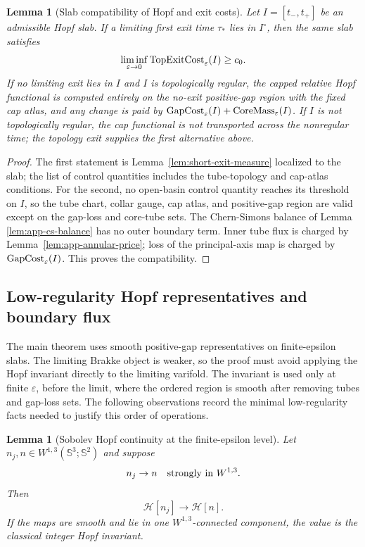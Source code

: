 \documentclass[11pt]{article}
\newtheorem{lemma}[theorem]{Lemma}
\theoremstyle{definition}
\newcommand{\Sph}{\mathbb S}
\newcommand{\eps}{\varepsilon}
\newcommand{\Hopf}{\mathcal H}
\begin{document}
\begin{lemma}[Slab compatibility of Hopf and exit costs]
\label{lem:app-slab-compatibility}
Let \(I=[t_-,t_+]\) be an admissible Hopf slab.  If a limiting first exit time
\(\tau_\ast\) lies in \(I^\circ\), then the same slab satisfies
\[
        \liminf_{\eps\to0}
        {\rm TopExitCost}_\eps(I)\ge c_0 .
\]
If no limiting exit lies in \(I\) and \(I\) is topologically regular, the capped
relative Hopf functional is computed entirely on the no-exit positive-gap
region with the fixed cap atlas, and any change is paid by
\({\rm GapCost}_\eps(I)+{\rm CoreMass}_\eps(I)\).  If \(I\) is not
topologically regular, the cap functional is not transported across the
nonregular time; the topology exit supplies the first alternative above.
\end{lemma}

\begin{proof}
The first statement is Lemma~\ref{lem:short-exit-measure} localized to the
slab; the list of control quantities includes the tube-topology and cap-atlas conditions. For
the second, no open-basin control quantity reaches its threshold on \(I\), so the tube
chart, collar gauge, cap atlas, and positive-gap region are valid except on the
gap-loss and core-tube sets.  The Chern-Simons balance of Lemma
\ref{lem:app-cs-balance} has no outer boundary term.  Inner tube flux is charged
by Lemma~\ref{lem:app-annular-price}; loss of the principal-axis map is charged
by \({\rm GapCost}_\eps(I)\).  This proves the compatibility.
\end{proof}

\subsection{Low-regularity Hopf representatives and boundary flux}

The main theorem uses smooth positive-gap representatives on finite-epsilon
slabs.  The limiting Brakke object is weaker, so the proof must avoid applying
the Hopf invariant directly to the limiting varifold.  The invariant is used
only at finite \(\eps\), before the limit, where the ordered region is smooth
after removing tubes and gap-loss sets.  The following observations record the
minimal low-regularity facts needed to justify this order of operations.

\begin{lemma}[Sobolev Hopf continuity at the finite-epsilon level]
\label{lem:app-sobolev-hopf}
Let \(n_j,n\in W^{1,3}(\Sph^3;\Sph^2)\) and suppose
\[
        n_j\to n
        \quad\hbox{strongly in }W^{1,3}.
\]
Then
\[
        \Hopf[n_j]\to\Hopf[n].
\]
If the maps are smooth and lie in one \(W^{1,3}\)-connected component, the
value is the classical integer Hopf invariant.
\end{lemma}
\end{document}
